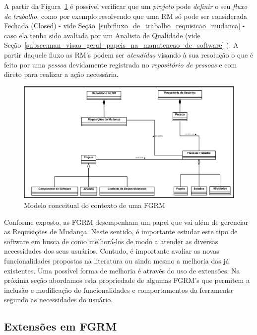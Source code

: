 A partir da Figura~\ref{fig:diagrama-classe-conceitual-fgrm} é possível
verificar que um \textit{projeto} pode \textit{definir} o seu \textit{fluxo de
	trabalho}, como por exemplo resolvendo que uma RM só pode ser considerada
Fechada (Closed) - vide Seção~\ref{sub:fluxo_de_trabalho_requisicao_mudanca} -
caso ela tenha sido avaliada por um Analista de Qualidade (vide
Seção~\ref{subsec:man_visao_geral_papeis_na_manutencao_de_software} ). A partir
daquele fluxo as RM's podem ser \textit{atendidas} visando à sua resolução o que
é feito por uma \textit{pessoa} devidamente registrada no \textit{repositório de
	pessoas} e com direto para realizar a ação necessária.

\begin{figure}[htpb] \centering
	\includegraphics[width=1.15\linewidth]{./chapter-manutencao-software-visao-geral/img/diagrama-classe-conceitual-fgrm.pdf}
	\caption{Modelo conceitual do contexto de uma FGRM}
	\label{fig:diagrama-classe-conceitual-fgrm}
\end{figure}

Conforme exposto, as FGRM desempenham um papel que vai além de gerenciar as
Requisições de Mudança. Neste sentido, é importante estudar este tipo de
software em busca de como melhorá-los de modo a atender as diversas necessidades
dos seus usuários. Contudo, é importante avaliar as novas funcionalidades
propostas na li\-te\-ra\-tu\-ra ou ainda mesmo a melhoria das já existentes. Uma
possível forma de melhoria é através do uso de extensões. Na próxima seção
abordamos esta propriedade de algumas FGRM's que permitem a inclusão e
modificação de funcionalidades e comportamentos da ferramenta segundo as
necessidades do usuário.
\todoend

\subsection{Extensões em FGRM}
\label{subsec:manutencao_visao_geral_extensoes_fgrm}

